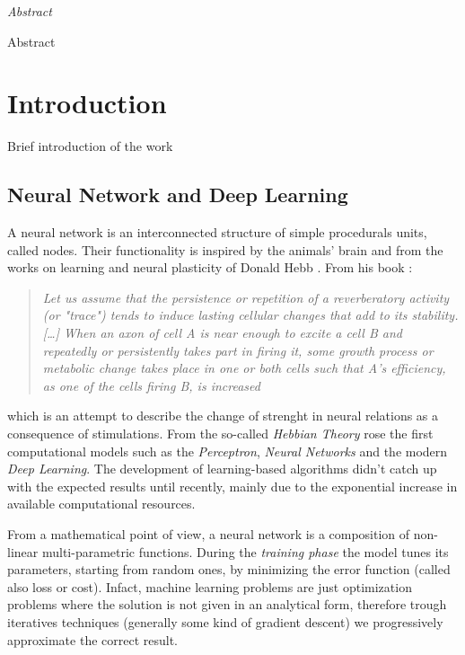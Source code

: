 \documentclass[12pt,a4paper]{report}
\begin{document}
\newpage

\vspace*{125px}
\LARGE\textit{Abstract}
\normalsize
\vspace{2mm}

Abstract

\newpage
\normalsize 

\tableofcontents

\chapter{Introduction}

Brief introduction of the work

\section{Neural Network and Deep Learning}

A neural network is an interconnected structure of simple procedurals units, called nodes. Their functionality is inspired by the animals' brain and from the works on learning and neural plasticity of Donald Hebb \cite{hebb-learning}. From his book :

\begin{quote}
 \begin{center}
  \textit{Let us assume that the persistence or repetition of a reverberatory activity (or "trace") tends to induce lasting cellular changes that add to its stability.[…] When an axon of cell A is near enough to excite a cell B and repeatedly or persistently takes part in firing it, some growth process or metabolic change takes place in one or both cells such that A's efficiency, as one of the cells firing B, is increased}
 \end{center}
\end{quote}

which is an attempt to describe the change of strenght in neural relations as a consequence of stimulations.
From the so-called \textit{Hebbian Theory} rose the first computational models such as the \textit{Perceptron}, \textit{Neural Networks} and the modern \textit{Deep Learning}. 
The development of learning-based algorithms didn't catch up with the expected results until recently, mainly due to the exponential increase in available computational resources.

From a mathematical point of view, a neural network is a composition of non-linear multi-parametric functions. 
During the {\it training phase} the model tunes its parameters, starting from random ones, by minimizing the error function (called also loss or cost). 
Infact, machine learning problems are just optimization problems where the solution is not given in an analytical form, therefore trough iteratives techniques (generally some kind of gradient descent) we progressively approximate the correct result.
\end{document}
